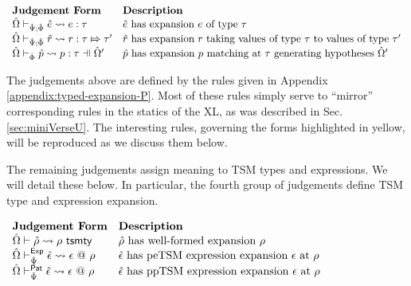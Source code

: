 \vspace{6px}
$\begin{array}{ll}
\textbf{Judgement Form} & \textbf{Description}\\
\expandsPX{\ue}{e}{\tau} & \text{$\ue$ has expansion $e$ of type $\tau$}\\
\rExpandsSP{\uOmega}{\uPsi}{\uPhi}{\urv}{r}{\tau}{\tau'} & \text{$\urv$ has expansion $r$ taking values of type $\tau$ to values of type $\tau'$}\\
\patExpandsP{\uOmega'}{\uPhi}{\upv}{p}{\tau} & \text{$\upv$ has expansion $p$ matching at $\tau$  generating hypotheses $\uOmega'$}
\end{array}$
\vspace{6px}

The judgements above are defined by the rules given in Appendix \ref{appendix:typed-expansion-P}. Most of these rules simply serve to ``mirror'' corresponding rules in the statics of the XL, as was described in Sec. \ref{sec:miniVerseU}. The interesting rules, governing the forms highlighted in yellow, will be reproduced as we discuss them below.

The remaining judgements assign meaning to TSM types and expressions. We will detail these below. In particular, the fourth group of judgements define TSM type and expression expansion.

\vspace{6px}
$\begin{array}{ll}
\textbf{Judgement Form} & \textbf{Description}\\
{\hat\Omega} \vdash {\hat\rho} \leadsto \rho ~\mathsf{tsmty} & \text{${\hat\rho}$ has well-formed expansion $\rho$}\\
{\hat\Omega} \vdash_{\hat{\Psi}}^{\mathsf{Exp}} {\hat\epsilon} \leadsto \epsilon~@~\rho & \text{${\hat\epsilon}$ has peTSM expression expansion $\epsilon$ at $\rho$}\\
{\hat\Omega} \vdash_{\hat{\Psi}}^{\mathsf{Pat}} {\hat\epsilon} \leadsto \epsilon~@~\rho & \text{${\hat\epsilon}$ has ppTSM expression expansion $\epsilon$ at $\rho$}
\end{array}$
\vspace{6px}

